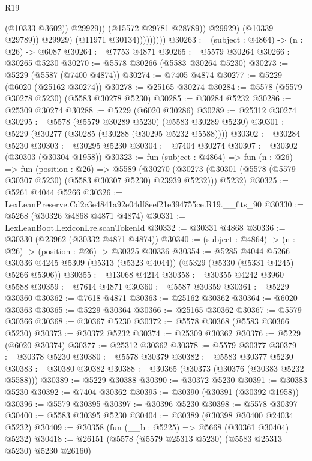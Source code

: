 \begin{lexlean}{R19}
\begin{coremodule}
                                  (@10333 @3602))
                                @29929))
                            (@15572 @29781 @28789))
                          @29929)
                        (@10339 @29789))
                      @29929)
                    (@11971 @30134)))))))))
@30263 := (subject : @4864) -> (n : @26) -> @6087
@30264 := @7753 @4871
@30265 := @5579 @30264
@30266 := @30265 @5230
@30270 := @5578 @30266 (@5583 @30264 @5230)
@30273 := @5229 (@5587 (@7400 @4874))
@30274 := @7405 @4874
@30277 := @5229 (@6020 (@25162 @30274))
@30278 := @25165 @30274
@30284 := @5578 (@5579 @30278 @5230) (@5583 @30278 @5230)
@30285 := @30284 @5232
@30286 := @25309 @30274
@30288 := @5229 (@6020 @30286)
@30289 := @25312 @30274
@30295 := @5578 (@5579 @30289 @5230) (@5583 @30289 @5230)
@30301 := @5229 (@30277 (@30285 (@30288 (@30295 @5232 @5588))))
@30302 := @30284 @5230
@30303 := @30295 @5230
@30304 := @7404 @30274
@30307 := @30302 (@30303 (@30304 @1958))
@30323 := fun (subject : @4864) =>
  fun (n : @26) =>
  fun (position : @26) =>
  @5589
    (@30270 (@30273 (@30301 (@5578 (@5579 @30307 @5230) (@5583 @30307 @5230) @23939 @5232))) @5232)
@30325 := @5261 @4044 @5266
@30326 := LexLeanPreserve.Cd2c3e4841a92e04df8eef21e394755ce.R19.__fits_90
@30330 := @5268 (@30326 @4868 @4871 @4874)
@30331 := LexLeanBoot.LexiconLre.scanTokenId
@30332 := @30331 @4868
@30336 := @30330 (@23962 (@30332 @4871 @4874))
@30340 := (subject : @4864) -> (n : @26) -> (position : @26) -> @30325 @30336
@30354 := @5285
    @4044
    @5266
    @30336
    @4245
    @5309
    (@5313 (@5323 @4044))
    (@5329 (@5330 (@5331 @4245) @5266 @5306))
@30355 := @13068 @4214
@30358 := @30355 @4242 @3960 @5588
@30359 := @7614 @4871
@30360 := @5587 @30359
@30361 := @5229 @30360
@30362 := @7618 @4871
@30363 := @25162 @30362
@30364 := @6020 @30363
@30365 := @5229 @30364
@30366 := @25165 @30362
@30367 := @5579 @30366
@30368 := @30367 @5230
@30372 := @5578 @30368 (@5583 @30366 @5230)
@30373 := @30372 @5232
@30374 := @25309 @30362
@30376 := @5229 (@6020 @30374)
@30377 := @25312 @30362
@30378 := @5579 @30377
@30379 := @30378 @5230
@30380 := @5578 @30379
@30382 := @5583 @30377 @5230
@30383 := @30380 @30382
@30388 := @30365 (@30373 (@30376 (@30383 @5232 @5588)))
@30389 := @5229 @30388
@30390 := @30372 @5230
@30391 := @30383 @5230
@30392 := @7404 @30362
@30395 := @30390 (@30391 (@30392 @1958))
@30396 := @5579 @30395
@30397 := @30396 @5230
@30398 := @5578 @30397
@30400 := @5583 @30395 @5230
@30404 := @30389 (@30398 @30400 @24034 @5232)
@30409 := @30358 (fun (__b : @5225) => @5668 (@30361 @30404) @5232)
@30418 := @26151 (@5578 (@5579 @25313 @5230) (@5583 @25313 @5230) @5230 @26160)

\end{coremodule}
\end{lexlean}
